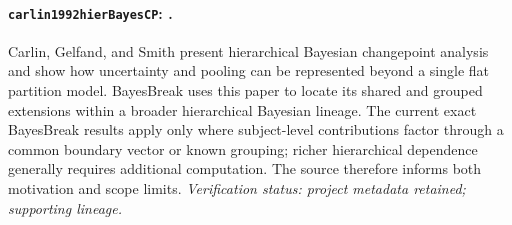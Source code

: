 
\paragraph{\texttt{carlin1992hierBayesCP}: \citet{carlin1992hierBayesCP}.}
Carlin, Gelfand, and Smith present hierarchical Bayesian changepoint analysis and show how uncertainty and pooling can be represented beyond a single flat partition model. BayesBreak uses this paper to locate its shared and grouped extensions within a broader hierarchical Bayesian lineage. The current exact BayesBreak results apply only where subject-level contributions factor through a common boundary vector or known grouping; richer hierarchical dependence generally requires additional computation. The source therefore informs both motivation and scope limits. \textit{Verification status: project metadata retained; supporting lineage.}
